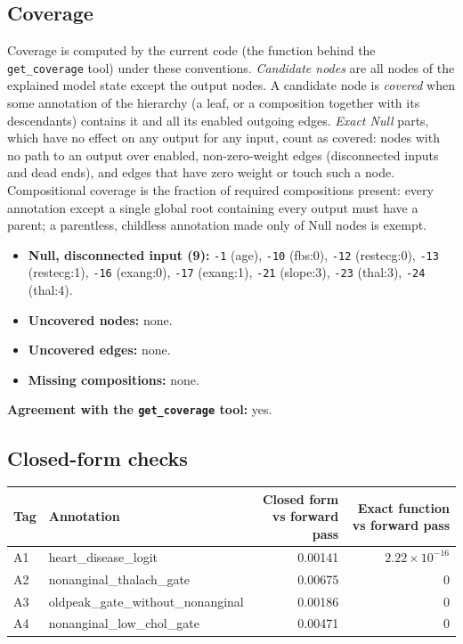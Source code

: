 \begin{drafted}
\subsection{Coverage}\label{app:heart-s2-c3:coverage}
Coverage is computed by the current code (the function behind the \texttt{get\_coverage} tool) under these conventions. \emph{Candidate nodes} are all nodes of the explained model state except the output nodes. A candidate node is \emph{covered} when some annotation of the hierarchy (a leaf, or a composition together with its descendants) contains it and all its enabled outgoing edges. \emph{Exact Null} parts, which have no effect on any output for any input, count as covered: nodes with no path to an output over enabled, non-zero-weight edges (disconnected inputs and dead ends), and edges that have zero weight or touch such a node. Compositional coverage is the fraction of required compositions present: every annotation except a single global root containing every output must have a parent; a parentless, childless annotation made only of Null nodes is exempt.

\begin{itemize}
\item \textbf{Null, disconnected input (9):} \texttt{-1} (age), \texttt{-10} (fbs:0), \texttt{-12} (restecg:0), \texttt{-13} (restecg:1), \texttt{-16} (exang:0), \texttt{-17} (exang:1), \texttt{-21} (slope:3), \texttt{-23} (thal:3), \texttt{-24} (thal:4).
\item \textbf{Uncovered nodes:} none.
\item \textbf{Uncovered edges:} none.
\item \textbf{Missing compositions:} none.
\end{itemize}
\noindent\textbf{Agreement with the \texttt{get\_coverage} tool:} yes.

\subsection{Closed-form checks}\label{app:heart-s2-c3:closedform}
{\small\noindent\begin{tabularx}{\linewidth}{@{}lXrr@{}}
\toprule Tag & Annotation & Closed form vs forward pass & Exact function vs forward pass \\ \midrule
A1 & heart\_\allowbreak{}disease\_\allowbreak{}logit & 0.00141 & $2.22\times 10^{-16}$ \\
A2 & nonanginal\_\allowbreak{}thalach\_\allowbreak{}gate & 0.00675 & 0 \\
A3 & oldpeak\_\allowbreak{}gate\_\allowbreak{}without\_\allowbreak{}nonanginal & 0.00186 & 0 \\
A4 & nonanginal\_\allowbreak{}low\_\allowbreak{}chol\_\allowbreak{}gate & 0.00471 & 0 \\
\bottomrule
\end{tabularx}\par}

\end{drafted}
